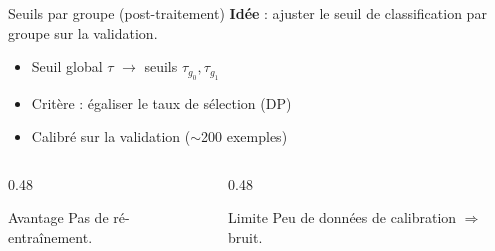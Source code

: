 \documentclass[aspectratio=169, 11pt]{beamer}
\begin{document}
\begin{frame}{Seuils par groupe (post-traitement)}
\textbf{Id\'ee} : ajuster le seuil de classification par groupe sur la validation.

\vspace{0.5em}
\begin{itemize}
    \item Seuil global $\tau$ $\to$ seuils $\tau_{g_0}, \tau_{g_1}$
    \item Crit\`ere : \'egaliser le taux de s\'election (DP)
    \item Calibr\'e sur la validation ($\sim$200 exemples)
\end{itemize}

\vspace{0.5em}
\begin{columns}[T]
\begin{column}{0.48\textwidth}
\begin{exampleblock}{Avantage}
Pas de r\'e-entra\^inement.
\end{exampleblock}
\end{column}
\begin{column}{0.48\textwidth}
\begin{alertblock}{Limite}
Peu de donn\'ees de calibration $\Rightarrow$ bruit.
\end{alertblock}
\end{column}
\end{columns}
\end{frame}
\end{document}
